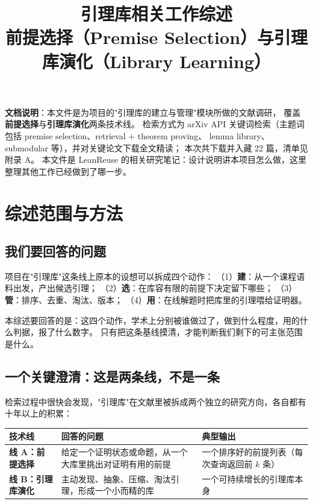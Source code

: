 \documentclass[UTF8,a4paper,11pt,fontset=windows]{ctexart}
\title{\bfseries 引理库相关工作综述\\[2mm]
       \large 前提选择（Premise Selection）与引理库演化（Library Learning）}
\author{}
\date{}
\begin{document}
\maketitle
\thispagestyle{fancy}

\begin{keybox}
\textbf{文档说明}：本文件是为项目的"引理库的建立与管理"模块所做的文献调研，
覆盖\textbf{前提选择}与\textbf{引理库演化}两条技术线。
检索方式为 arXiv API 关键词检索（主题词包括 premise selection、retrieval + theorem proving、
lemma library、submodular 等），并对关键论文下载全文精读；
本次共下载并入藏 22 篇，清单见附录 A。
本文件是 LeanReuse 的相关研究笔记：设计说明讲本项目怎么做，这里整理其他工作已经做到了哪一步。
\end{keybox}

\vspace{2mm}
\tableofcontents
\vspace{4mm}

\section{综述范围与方法}

\subsection{我们要回答的问题}

项目在"引理库"这条线上原本的设想可以拆成四个动作：
（1）\textbf{建}：从一个课程语料出发，产出候选引理；
（2）\textbf{选}：在库容有限的前提下决定留下哪些；
（3）\textbf{管}：排序、去重、淘汰、版本；
（4）\textbf{用}：在线解题时把库里的引理喂给证明器。

本综述要回答的是：这四个动作，学术上分别被谁做过了，做到什么程度，用的什么判据，报了什么数字。
只有把这条基线摸清，才能判断我们剩下的可主张范围是什么。

\subsection{一个关键澄清：这是两条线，不是一条}

检索过程中很快会发现，"引理库"在文献里被拆成两个独立的研究方向，各自都有十年以上的积累：

\begin{table}[htbp]
\centering
\small
\begin{tabularx}{\textwidth}{@{}p{2.6cm}p{5.2cm}Y@{}}
\toprule
\textbf{技术线} & \textbf{回答的问题} & \textbf{典型输出} \\
\midrule
\textbf{线 A：前提选择} & 给定一个证明状态或命题，从一个大库里挑出对证明有用的前提 &
一个排序好的前提列表（每次查询返回前 $k$ 条） \\
\midrule
\textbf{线 B：引理库演化} & 主动发现、抽象、压缩、淘汰引理，形成一个小而精的库 &
一个可持续增长的引理库本身 \\
\bottomrule
\end{tabularx}
\end{table}
\end{document}
